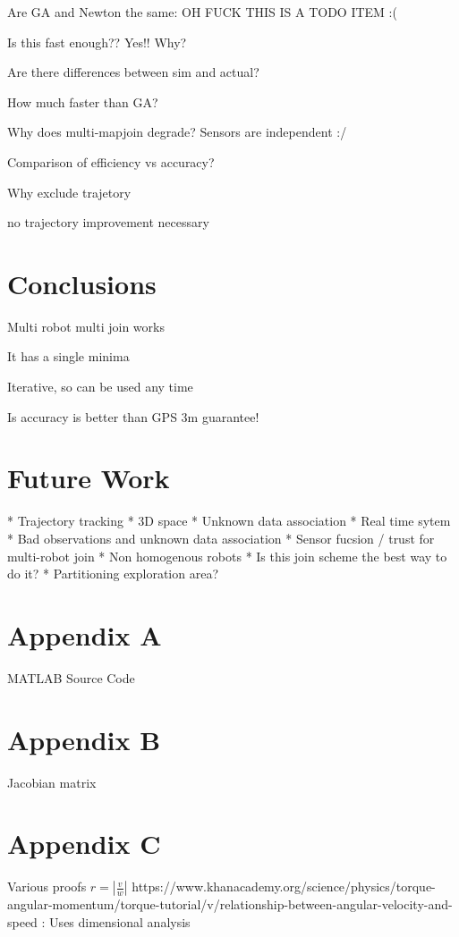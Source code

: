\documentclass[12pt]{report}
\begin{document}
Are GA and Newton the same:  OH FUCK THIS IS A TODO ITEM :(


Is this fast enough?? Yes!!  Why?

Are there differences between sim and actual?

How much faster than GA?

Why does multi-mapjoin degrade?  Sensors are independent :/

Comparison of efficiency vs accuracy?

Why exclude trajetory

no trajectory improvement necessary

\chapter{Conclusions}

Multi robot multi join works

It has a single minima

Iterative, so can be used any time

Is accuracy is better than GPS 3m guarantee!


\chapter{Future Work}

* Trajectory tracking
* 3D space
* Unknown data association
* Real time sytem
* Bad observations and unknown data association
* Sensor fucsion / trust for multi-robot join
* Non homogenous robots
* Is this join scheme the best way to do it?
* Partitioning exploration area?

\chapter{Appendix A}
MATLAB Source Code

\chapter{Appendix B}
Jacobian matrix

\chapter{Appendix C}
Various proofs
$r = |\frac{v}{w}|$
 https://www.khanacademy.org/science/physics/torque-angular-momentum/torque-tutorial/v/relationship-between-angular-velocity-and-speed 
: Uses dimensional analysis
\end{document}
